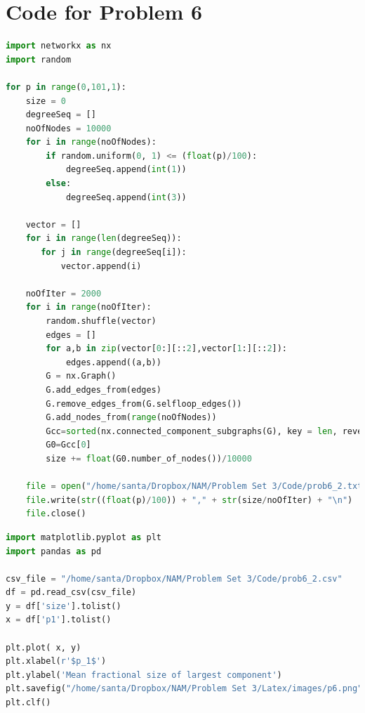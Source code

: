 \documentclass{article}
\begin{document}
\section*{Code for Problem 6}
\begin{lstlisting}[language=Python, breaklines=true]
import networkx as nx
import random

for p in range(0,101,1):
    size = 0
    degreeSeq = []
    noOfNodes = 10000
    for i in range(noOfNodes):
        if random.uniform(0, 1) <= (float(p)/100):
            degreeSeq.append(int(1))
        else:
            degreeSeq.append(int(3))
    
    vector = []
    for i in range(len(degreeSeq)):
       for j in range(degreeSeq[i]):
           vector.append(i)
    
    noOfIter = 2000
    for i in range(noOfIter):
        random.shuffle(vector)
        edges = []
        for a,b in zip(vector[0:][::2],vector[1:][::2]):
            edges.append((a,b))
        G = nx.Graph()
        G.add_edges_from(edges)
        G.remove_edges_from(G.selfloop_edges())
        G.add_nodes_from(range(noOfNodes))
        Gcc=sorted(nx.connected_component_subgraphs(G), key = len, reverse=True)
        G0=Gcc[0]
        size += float(G0.number_of_nodes())/10000
    
    file = open("/home/santa/Dropbox/NAM/Problem Set 3/Code/prob6_2.txt", "a")
    file.write(str((float(p)/100)) + "," + str(size/noOfIter) + "\n")
    file.close()
\end{lstlisting}
\begin{lstlisting}[language=Python, breaklines=true, caption=To plot the graph]
import matplotlib.pyplot as plt
import pandas as pd

csv_file = "/home/santa/Dropbox/NAM/Problem Set 3/Code/prob6_2.csv"
df = pd.read_csv(csv_file)
y = df['size'].tolist()
x = df['p1'].tolist()

plt.plot( x, y)
plt.xlabel(r'$p_1$')
plt.ylabel('Mean fractional size of largest component')
plt.savefig("/home/santa/Dropbox/NAM/Problem Set 3/Latex/images/p6.png")
plt.clf()
\end{lstlisting}
\end{document}
